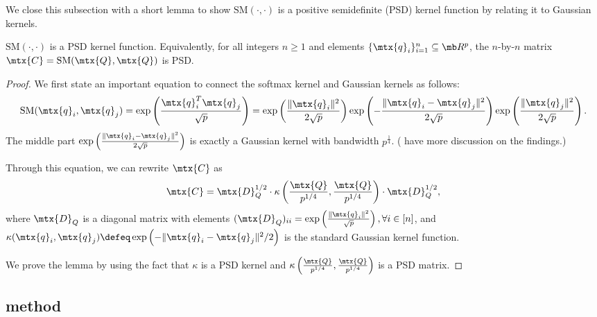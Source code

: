 We close this subsection with a short lemma to show $\text{SM}(\cdot, \cdot)$ is a positive semidefinite (PSD) kernel function \citep[Definition~12.6]{wainwright2019high} by relating it to Gaussian kernels.
\begin{lem}
$\text{SM}(\cdot, \cdot)$ is a PSD kernel function. 
Equivalently, for all integers $n \geq 1$ and elements $\{\mtx{q}_i\}_{i=1}^n \subseteq \mb R^{p}$,
the $n$-by-$n$ matrix $\mtx{C} = \text{SM}(\mtx{Q}, \mtx{Q})$ is PSD.
\end{lem}
\begin{proof}
We first state an important equation to connect the softmax kernel and Gaussian kernels as follows:
\begin{align*}
\text{SM}(\mtx{q}_i, \mtx{q}_j) = \exp\left(\frac{\mtx{q}_i^T \mtx{q}_j}{\sqrt{p}}\right) 
= \exp\left(\frac{\|\mtx{q}_i\|^2}{2 \sqrt{p}}\right) \exp\left(-\frac{\|\mtx{q}_i - \mtx{q}_j\|^2}{2 \sqrt{p}}\right) \exp\left(\frac{\|\mtx{q}_j\|^2}{2 \sqrt{p}}\right).
\end{align*}
The middle part $\exp\left(\frac{\|\mtx{q}_i - \mtx{q}_j\|^2}{2 \sqrt{p}}\right)$ is exactly a Gaussian kernel with bandwidth $p^{\frac14}$.
(\citet{DBLP:journals/corr/abs-2009-14794} have more discussion on the findings.)

Through this equation, we can rewrite $\mtx{C}$ as
\begin{align}
\label{eqn:sm_rbf}
\mtx{C} = \mtx{D}_Q^{1/2} \cdot \kappa\left(\frac{\mtx{Q}}{p^{1/4}}, \frac{\mtx{Q}}{p^{1/4}} \right) \cdot \mtx{D}_Q^{1/2},
\end{align}
where $\mtx{D}_Q$ is a diagonal matrix with elements $(\mtx{D}_Q)_{ii} = \exp\left(\frac{\|\mtx{q}_i\|^2}{\sqrt{p}}\right), \forall i \in [n]$,
and $\kappa(\mtx{q}_i, \mtx{q}_j) \defeq \exp\left(-{\|\mtx{q}_i - \mtx{q}_j\|^2}/{2}\right)$ is the standard Gaussian kernel function.

We prove the lemma by using the fact that $\kappa$ is a PSD kernel and $\kappa\left(\frac{\mtx{Q}}{p^{1/4}}, \frac{\mtx{Q}}{p^{1/4}} \right)$ is a PSD matrix.
\end{proof}


\subsection{\nystrom method}

